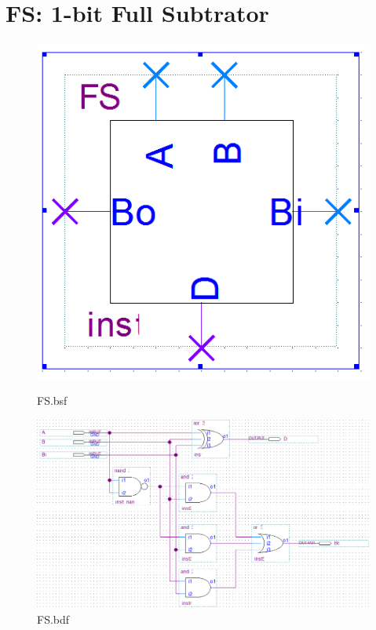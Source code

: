 \documentclass[12pt,a4paper]{article}
\begin{document}
  \section{FS: 1-bit Full Subtrator}
  \begin{figure}[H]
    \centering
    \begin{subcaptionblock}{0.15\linewidth}
      \includegraphics[width=\linewidth]{FS_bsf.png}
      \caption{FS.bsf}
    \end{subcaptionblock}
    \begin{subcaptionblock}{0.84\linewidth}
      \includegraphics[width=\linewidth]{FS_bdf.png}
      \caption{FS.bdf}
    \end{subcaptionblock}
  \end{figure}
\end{document}
